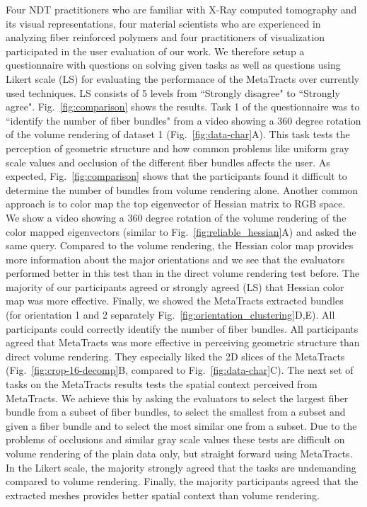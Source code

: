 Four NDT practitioners who are familiar with X-Ray computed tomography and its visual representations, four material scientists who are experienced in analyzing fiber reinforced polymers and four practitioners of visualization participated in the user evaluation of our work. We therefore setup a questionnaire with questions on solving given tasks as well as questions using Likert scale (LS) for evaluating the performance of the MetaTracts over currently used techniques. LS consists of 5 levels from ``Strongly disagree" to ``Strongly agree". Fig.~\ref{fig:comparison} shows the results. Task 1 of the questionnaire was to ``identify the number of fiber bundles" from a video showing a 360 degree rotation of the volume rendering of dataset 1 (Fig.~\ref{fig:data-char}A). This task tests the perception of geometric structure and how common problems like uniform gray scale values and occlusion of the different fiber bundles affects the user. As expected, Fig.~\ref{fig:comparison} shows that the participants found it difficult to determine the number of bundles from volume rendering alone. Another common approach is to color map the top eigenvector of Hessian matrix to RGB space. We show a video showing a 360 degree rotation of the volume rendering of the color mapped eigenvectors (similar to Fig.~\ref{fig:reliable_hessian}A) and asked the same query. Compared to the volume rendering, the Hessian color map provides more information about the major orientations and we see that the evaluators performed better in this test than in the direct volume rendering test before. The majority of our participants agreed or strongly agreed (LS) that Hessian color map was more effective. Finally, we showed the MetaTracts extracted bundles (for orientation 1 and 2 separately Fig.~\ref{fig:orientation_clustering}D,E). All participants could correctly identify the number of fiber bundles. All participants agreed that MetaTracts was more effective in perceiving geometric structure than direct volume rendering. They especially liked the 2D slices of the MetaTracts (Fig.~\ref{fig:crop-16-decomp}B, compared to Fig.~\ref{fig:data-char}C).
The next set of tasks on the MetaTracts results tests the spatial context perceived from MetaTracts. We achieve this by asking the evaluators to select the largest fiber bundle from a subset of fiber bundles, to select the smallest from a subset and given a fiber bundle and to select the most similar one from a subset. Due to the problems of occlusions and similar gray scale values these tests are difficult on volume rendering of the plain data only, but straight forward using MetaTracts. In the Likert scale, the majority strongly agreed that the tasks are undemanding compared to volume rendering.
Finally, the majority participants agreed that the extracted meshes provides better spatial context than volume rendering. 
 
